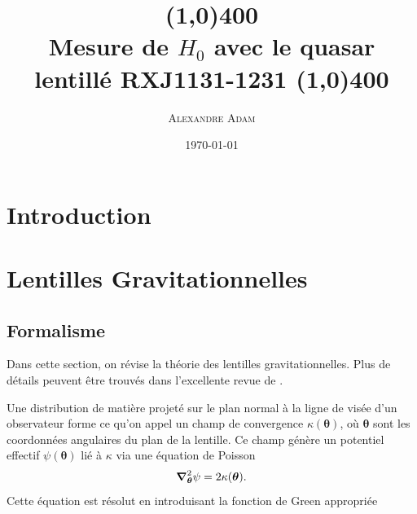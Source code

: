 \documentclass[times,10pt,twocolumn]{article}
\title{\vspace{-10mm}
\line(1,0){400}\\
Mesure de $H_0$ avec le quasar lentillé \textsc{RXJ1131-1231}
\line(1,0){400}
\vspace{-4mm}
}
\author{\large \textsc{Alexandre Adam}}
\affiliation{\vspace{2mm} PHY6669 -- Cosmologie\\
Département de physique \\ Université de Montréal
}
\date{\today}
\begin{document}
\twocolumn[
\maketitle
\begin{onecolabstract} %
\vspace{4mm} %
\end{onecolabstract}
]

\section{Introduction}\label{sec:intro}
\section{Lentilles Gravitationnelles}\label{sec:lens}
\subsection{Formalisme}
Dans cette section, on révise la théorie des lentilles gravitationnelles. 
Plus de détails peuvent être trouvés dans l'excellente revue de \cite{Treu2010}. \par

Une distribution de matière projeté sur le plan normal à la ligne de visée d'un 
observateur forme ce qu'on 
appel un champ de convergence $\kappa(\boldsymbol{\theta})$, où $\boldsymbol{\theta}$ sont 
les coordonnées angulaires du plan de la lentille. Ce champ génère un potentiel 
effectif $\psi(\boldsymbol{\theta})$ lié à $\kappa$ via une équation de Poisson
\begin{equation}\label{eq:Poisson} 
        \grad^{2}_{\boldsymbol{\theta}} \psi = 2 \kappa(\boldsymbol{\theta} ).
\end{equation} 
Cette équation est résolut en introduisant la fonction de Green appropriée
\end{document}

